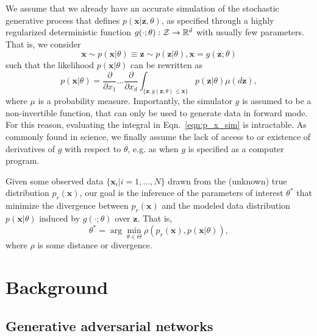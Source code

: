 \documentclass[twocolumn,superscriptaddress,aps]{revtex4-1}
\theoremstyle{plain}
\begin{document}
We assume that we already have an accurate simulation of the stochastic
generative process that defines $p(\mathbf{x}|\mathbf{z},\theta)$, as
specified through a highly regularized deterministic function $g(\cdot; \theta) : {\cal Z} \to
\mathbb{R}^d$ with usually few parameters. That is, we consider
\begin{equation}\label{eqn:p_theta}
    \mathbf{x} \sim p(\mathbf{x}|\theta) \equiv \mathbf{z} \sim p(\mathbf{z}|\theta), \mathbf{x} = g(\mathbf{z}; \theta)
\end{equation}
such that the likelihood $p(\mathbf{x}|\theta)$ can be rewritten as
\begin{equation}\label{eqn:p_x_sim}
    p(\mathbf{x}|\theta) = \frac{\partial}{\partial x_1} \dots \frac{\partial}{\partial x_d} \int_{\{\mathbf{z}:g(\mathbf{z};\theta) \leq \mathbf{x}\}} p(\mathbf{z}|\theta) \mu(d\mathbf{z}),
\end{equation}
where $\mu$ is a probability measure.
Importantly, the simulator $g$ is assumed to be a non-invertible function, that can only be
used to generate data in forward mode. For this reason, evaluating the integral
in Eqn.~\ref{eqn:p_x_sim} is intractable. As commonly found
in science, we finally assume the lack of access to or existence of derivatives of $g$ with respect to $\theta$,
e.g. as when $g$ is specified as a computer program.

Given some observed data $\{ \mathbf{x}_i | i=1, \dots, N \}$ drawn from the
(unknown) true distribution $p_r(\mathbf{x})$, our goal is the inference of the parameters
of interest $\theta^*$ that minimize the divergence between $p_r(\mathbf{x})$ and
the modeled data distribution $p(\mathbf{x}|\theta)$ induced by $g(\cdot;
\theta)$ over $\mathbf{z}$. That is,
\begin{equation}
    \theta^* = \arg \min_{\theta \in \Theta} \rho(p_r(\mathbf{x}), p(\mathbf{x}|\theta)),
\end{equation}
where $\rho$ is some distance or divergence.



\section{Background}

\subsection{Generative adversarial networks}
\label{sec:gans}
\end{document}
